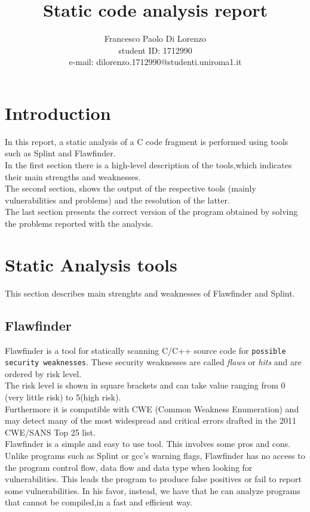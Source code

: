 \documentclass[a4paper,12pt]{article}
\begin{document}
%
   \title{Static code analysis report}

   \author{Francesco Paolo Di Lorenzo  \\ student ID: 1712990 \\ e-mail: dilorenzo.1712990@studenti.uniroma1.it}
          
   \date{}

   \maketitle
   
   
 


\section*{Introduction}
In this report, a static analysis of a C code fragment is performed using tools such as Splint and Flawfinder. \\
In the first section there is a high-level description of the tools,which indicates their main strengths and weaknesses. \\
The second section, shows the output of the respective tools (mainly vulnerabilities and problems) and the resolution of the latter.\\
The last section presents the correct version of the program obtained by solving the problems reported with the analysis.


\section{Static Analysis tools}
This section describes main strenghts and weaknesses of Flawfinder and Splint.
\subsection{Flawfinder}
Flawfinder is a tool for statically scanning C/C++ source code for \texttt{possible security weaknesses}. These security weaknesses are called \textit{flaws} or \textit{hits} and are ordered by risk level.\\
The risk level is shown in square brackets and can take value ranging from 0 (very little risk) to 5(high risk)\cite{flaw}.\\
Furthermore it is compatible with CWE (Common
Weakness Enumeration)\cite{flaw2}\cite{CWE} and may detect many of the most widespread and
critical errors drafted in the 2011 CWE/SANS Top 25 list.\\
Flawfinder is a simple and easy to use tool. This involves some pros and cons.\cite{flaw}\\
Unlike programs such as Splint or gcc's warning flags, Flawfinder has no access to the program control flow, data flow and data type when looking for vulnerabilities.
This leads the program to produce false positives or fail to report some vulnerabilities.
In his favor, instead, we have that he can analyze programs that cannot be compiled,in a fast and efficient way.
\end{document}
